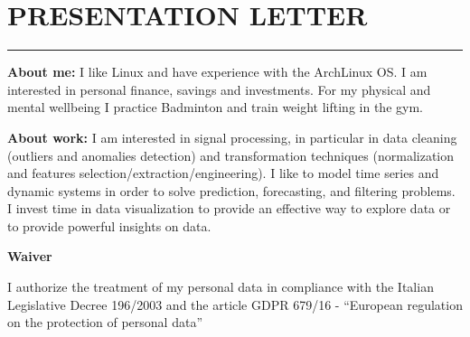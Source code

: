 \documentclass[10pt]{article}
\newcommand{\cvsection}[1]{\section*{\centering\normalsize\uppercase{#1}}\vspace{-16pt}\rule{\linewidth}{0.2pt}\vspace{6pt}}
\begin{document}

\cvsection{Presentation letter}
\textbf{About me:}
I like Linux and have experience with the ArchLinux OS. I am interested in personal finance, savings and investments. For my physical and mental wellbeing I practice Badminton and train weight lifting in the gym.




\textbf{About work:}
I am interested in signal processing, in particular in data cleaning (outliers and anomalies detection) and transformation techniques (normalization and features selection/extraction/engineering). I like to model time series and dynamic systems in order to solve prediction, forecasting, and filtering problems. I invest time in data visualization to provide an effective way to explore data or to provide powerful insights on data.




\vfill
{\centering \textbf{Waiver} \par}
{\small I authorize the treatment of my personal data in compliance with the Italian Legislative Decree 196/2003 and the article GDPR 679/16 - “European regulation on the protection of personal data”}
\end{document}
